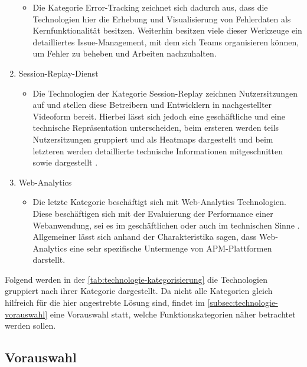 \begin{enumerate}
\begin{itemize}
		\item Die Kategorie Error-Tracking zeichnet sich dadurch aus, dass die Technologien hier die Erhebung und Visualisierung von Fehlerdaten als Kernfunktionalität besitzen. Weiterhin besitzen viele dieser Werkzeuge ein detailliertes Issue-Management, mit dem sich Teams organisieren können, um Fehler zu beheben und Arbeiten nachzuhalten.
	\end{itemize}
	\item Session-Replay-Dienst
	\begin{itemize}
		\item Die Technologien der Kategorie Session-Replay zeichnen Nutzersitzungen auf und stellen diese Betreibern und Entwicklern in nachgestellter Videoform bereit. Hierbei lässt sich jedoch eine geschäftliche und eine technische Repräsentation unterscheiden, beim ersteren werden teils Nutzersitzungen gruppiert und als Heatmaps dargestellt und beim letzteren werden detaillierte technische Informationen mitgeschnitten sowie dargestellt \cite{Webalyt}.
	\end{itemize}
	\item Web-Analytics
	\begin{itemize}
		\item Die letzte Kategorie beschäftigt sich mit Web-Analytics Technologien. Diese beschäftigen sich mit der Evaluierung der Performance einer Webanwendung, sei es im geschäftlichen oder auch im technischen Sinne \cite{APracticalEvaluationOfWebAnalytics} \cite{WebAnalyticsAnHourADay}. Allgemeiner lässt sich anhand der Charakteristika sagen, dass Web-Analytics eine sehr spezifische Untermenge von APM-Plattformen darstellt.
	\end{itemize}
\end{enumerate}

Folgend werden in der \autoref{tab:technologie-kategorisierung} die Technologien gruppiert nach ihrer Kategorie dargestellt. Da nicht alle Kategorien gleich hilfreich für die hier angestrebte Lösung sind, findet im \autoref{subsec:technologie-vorauswahl} eine Vorauswahl statt, welche Funktionskategorien näher betrachtet werden sollen.



\subsection{Vorauswahl}
\label{subsec:technologie-vorauswahl}

